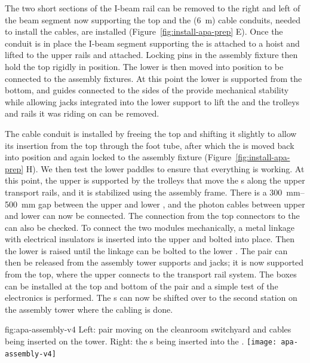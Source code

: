 The two short sections of the I-beam rail can be removed to the right and left of the beam segment now supporting the top  and the (\SI{6}{m}) cable conduits, needed to install the  cables, are installed (Figure~\ref{fig:install-apa-prep} E). 
Once the conduit is in place the I-beam segment supporting the  is attached to a hoist and lifted to the upper rails and attached. 
Locking pins in the  assembly fixture then hold the top  rigidly in position. 
The lower  is then moved into position to be connected to the assembly fixtures. 
At this point the  lower  is supported from the bottom, and guides connected to the sides of the  provide mechanical stability while allowing jacks integrated into the lower support to lift the  and the trolleys and rails it was riding on can be removed. 


The cable conduit is installed by freeing the top  and shifting it slightly to allow its insertion from the top through the foot tube, after which  
the  is moved back into position and again locked to the  assembly fixture (Figure~\ref{fig:install-apa-prep} H).
We then test the lower   paddles to ensure that everything is working. 
At this point, the upper  is supported by the trolleys that move the s along the upper transport rails, and it is stabilized using the  assembly frame. There is a \SIrange{300}{500}{mm} gap between the upper and lower , and the photon cables between upper and lower  can now be connected. 
The connection from the top connectors to the  can also be checked. 
To connect the two  modules mechanically, a metal linkage with electrical insulators is inserted into the upper  and bolted into place. Then the lower  is raised until the linkage can be bolted to the lower .  
The  pair can then be released from the assembly tower supports and jacks; it is now supported from the top, where the upper  connects to the transport rail system. The  boxes can be installed at the top and bottom of the  pair and a simple test of the electronics is performed.  
The s can now be shifted over to the second station on the assembly tower where the cabling is done.

\begin{dunefigure}{fig:apa-assembly-v4}
  { Left:  pair  moving on the cleanroom switchyard and cables being inserted on the tower. Right: the s being inserted into the \coldbox.
  }
\texttt{[image: apa-assembly-v4]}

\end{dunefigure}

